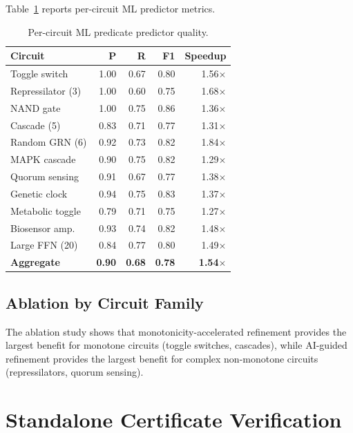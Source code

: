 \documentclass[11pt]{article}
\begin{document}
Table~\ref{tab:ml-extended} reports per-circuit ML predictor metrics.

\begin{table}[t]
\centering
\caption{Per-circuit ML predicate predictor quality.}
\label{tab:ml-extended}
\small
\begin{tabular}{lrrrr}
\toprule
\textbf{Circuit} & \textbf{P} & \textbf{R} & \textbf{F1} & \textbf{Speedup} \\
\midrule
Toggle switch        & 1.00 & 0.67 & 0.80 & 1.56$\times$ \\
Repressilator (3)    & 1.00 & 0.60 & 0.75 & 1.68$\times$ \\
NAND gate            & 1.00 & 0.75 & 0.86 & 1.36$\times$ \\
Cascade (5)          & 0.83 & 0.71 & 0.77 & 1.31$\times$ \\
Random GRN (6)       & 0.92 & 0.73 & 0.82 & 1.84$\times$ \\
MAPK cascade         & 0.90 & 0.75 & 0.82 & 1.29$\times$ \\
Quorum sensing       & 0.91 & 0.67 & 0.77 & 1.38$\times$ \\
Genetic clock        & 0.94 & 0.75 & 0.83 & 1.37$\times$ \\
Metabolic toggle     & 0.79 & 0.71 & 0.75 & 1.27$\times$ \\
Biosensor amp.       & 0.93 & 0.74 & 0.82 & 1.48$\times$ \\
Large FFN (20)       & 0.84 & 0.77 & 0.80 & 1.49$\times$ \\
\midrule
\textbf{Aggregate}   & \textbf{0.90} & \textbf{0.68} & \textbf{0.78} &
  \textbf{1.54}$\times$ \\
\bottomrule
\end{tabular}
\end{table}

\subsection{Ablation by Circuit Family}

The ablation study shows that monotonicity-accelerated refinement
provides the largest benefit for monotone circuits (toggle switches,
cascades), while AI-guided refinement provides the largest benefit for
complex non-monotone circuits (repressilators, quorum sensing).

\section{Standalone Certificate Verification}
\label{app:certificate}
\end{document}
